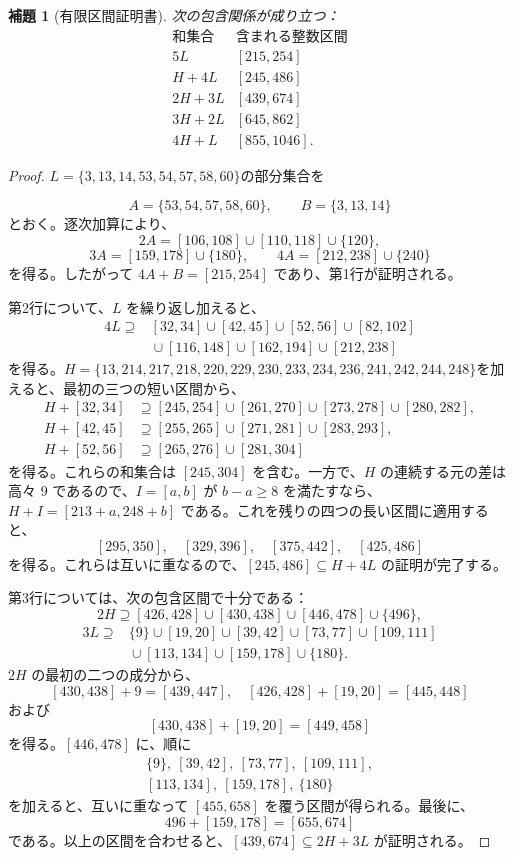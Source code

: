 \documentclass[12pt]{ltjsarticle}
\theoremstyle{plain}
\newtheorem{lemma}[theorem]{補題}
\begin{document}
\begin{lemma}[有限区間証明書]\label{lem:finitefive}
次の包含関係が成り立つ：
\[
\begin{array}{c|c}
\text{和集合}&\text{含まれる整数区間}\\ \hline
5L &[215,254]\\
H+4L &[245,486]\\
2H+3L &[439,674]\\
3H+2L &[645,862]\\
4H+L &[855,1046].
\end{array}
\]
\end{lemma}

\begin{proof}

$ L=\{3,13,14,53,54,57,58,60\}$の部分集合を

\[
 A=\{53,54,57,58,60\},\qquad B=\{3,13,14\}
\]
とおく。逐次加算により、
\[
 2A=[106,108]\cup[110,118]\cup\{120\},
\]
\[
 3A=[159,178]\cup\{180\},\qquad
 4A=[212,238]\cup\{240\}
\]
を得る。したがって $4A+B=[215,254]$ であり、第1行が証明される。

第2行について、$L$ を繰り返し加えると、
\[
\begin{split}
4L\supseteq{}&[32,34]\cup[42,45]\cup[52,56]\cup[82,102]\\
 &{}\cup[116,148]\cup[162,194]\cup[212,238]
\end{split}
\]
を得る。$ H=\{13,214,217,218,220,229,230,233,234,236,241,242,244,248\}$を加えると、最初の三つの短い区間から、
\[
\begin{aligned}
H+[32,34]&\supseteq[245,254]\cup[261,270]
 \cup[273,278]\cup[280,282],\\
H+[42,45]&\supseteq[255,265]\cup[271,281]\cup[283,293],\\
H+[52,56]&\supseteq[265,276]\cup[281,304]
\end{aligned}
\]
を得る。これらの和集合は $[245,304]$ を含む。一方で、$H$ の連続する元の差は高々 $9$ であるので、$I=[a,b]$ が $b-a\geq8$ を満たすなら、
$H+I=[213+a,248+b]$ である。これを残りの四つの長い区間に適用すると、
\[
 [295,350],\quad[329,396],\quad[375,442],\quad[425,486]
\]
を得る。これらは互いに重なるので、$[245,486]\subseteq H+4L$ の証明が完了する。

第3行については、次の包含区間で十分である：
\[
 2H\supseteq[426,428]\cup[430,438]\cup[446,478]\cup\{496\},
\]
\[
\begin{split}
3L\supseteq{}&\{9\}\cup[19,20]\cup[39,42]\cup[73,77]
 \cup[109,111]\\
 &{}\cup[113,134]\cup[159,178]\cup\{180\}.
\end{split}
\]
$2H$ の最初の二つの成分から、
\[
 [430,438]+9=[439,447],\quad
 [426,428]+[19,20]=[445,448]
\]
および
\[
 [430,438]+[19,20]=[449,458]
\]
を得る。$[446,478]$ に、順に
\[
\begin{gathered}
 \{9\},\ [39,42],\ [73,77],\ [109,111],\\
 [113,134],\ [159,178],\ \{180\}
\end{gathered}
\]
を加えると、互いに重なって $[455,658]$ を覆う区間が得られる。最後に、
\[
 496+[159,178]=[655,674]
\]
である。以上の区間を合わせると、$[439,674]\subseteq2H+3L$ が証明される。


\end{proof}
\end{document}
